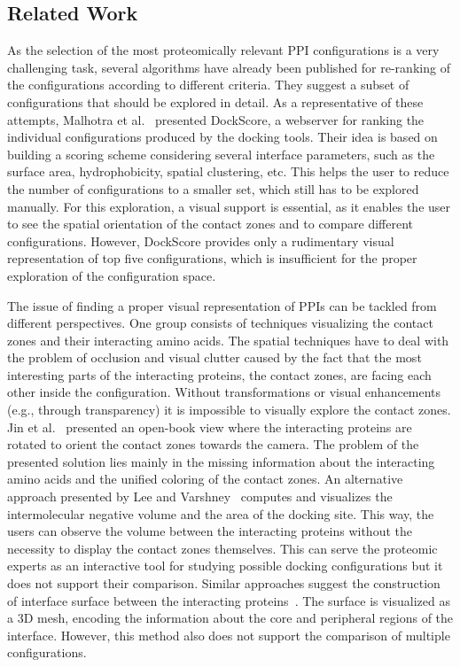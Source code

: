 \documentclass{bmcart}
\begin{document}
\subsection*{Related Work}
As the selection of the most proteomically relevant PPI configurations is a very challenging task, several algorithms have already been published for re-ranking of the configurations according to different criteria.
They suggest a subset of configurations that should be explored in detail.
As a representative of these attempts, Malhotra et al.~\cite{Malhotra2015} presented DockScore, a webserver for ranking the individual configurations produced by the docking tools. 
Their idea is based on building a scoring scheme considering several interface parameters, such as the surface area, hydrophobicity, spatial clustering, etc.
This helps the user to reduce the number of configurations to a smaller set, which still has to be explored manually.
For this exploration, a visual support is essential, as it enables the user to see the spatial orientation of the contact zones and to compare different configurations.
However, DockScore provides only a rudimentary visual representation of top five configurations, which is insufficient for the proper exploration of the configuration space.
 
The issue of finding a proper visual representation of PPIs can be tackled from different perspectives. One group consists of techniques visualizing the contact zones and their interacting amino acids.
The spatial techniques have to deal with the problem of occlusion and visual clutter caused by the fact that the most interesting parts of the interacting proteins, the contact zones, are facing each other inside the configuration.
Without transformations or visual enhancements (e.g., through transparency) it is impossible to visually explore the contact zones.
Jin et al.~\cite{Jin2014} presented an open-book view where the interacting proteins are rotated to orient the contact zones towards the camera.
The problem of the presented solution lies mainly in the missing information about the interacting amino acids and the unified coloring of the contact zones.
An alternative approach presented by Lee and Varshney~\cite{Varshney2003} computes and visualizes the intermolecular negative volume and the area of the docking site. %
This way, the users can observe the volume between the interacting proteins without the necessity to display the contact zones themselves.
This can serve the proteomic experts as an interactive tool for studying possible docking configurations but it does not support their comparison.
Similar approaches suggest the construction of interface surface between the interacting proteins~\cite{480793, Ban2006}.
The surface is visualized as a 3D mesh, encoding the information about the core and peripheral regions of the interface. 
However, this method also does not support the comparison of multiple configurations.
\end{document}
